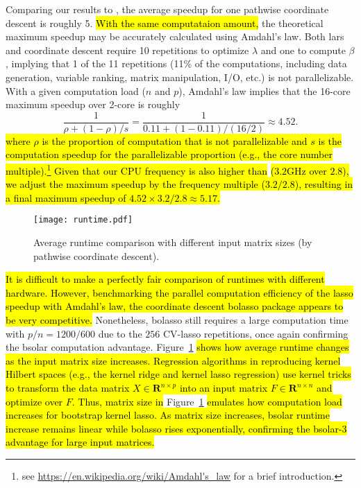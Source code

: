 \documentclass[11pt,review,authoryear]{elsarticle}
\begin{document}
Comparing our results to \citet{friedman2010regularization}, the average speedup for one pathwise coordinate descent is roughly 5. \hl{With the same computataion amount,} the theoretical maximum speedup may be accurately calculated using Amdahl's law. Both lars and coordinate descent require 10 repetitions to optimize $\lambda$ and one to compute $\beta$, implying that 1 of the 11 repetitions (11\% of the computations, including data generation, variable ranking, matrix manipulation, I/O, etc.) is not parallelizable. With a given computation load ($n$ and $p$), Amdahl's law implies that the 16-core maximum speedup over 2-core is roughly
%
\begin{equation}
  \frac{1}{\rho + (1-\rho)/s} = \frac{1}{0.11 + (1-0.11)/(16/2)} \approx 4.52.
\end{equation}
%
\hl{where $\rho$ is the proportion of computation that is not parallelizable and $s$ is the computation speedup for the parallelizable proportion (e.g., the core number multiple).\footnote{see \url{https://en.wikipedia.org/wiki/Amdahl's_law} for a brief introduction.} Given that our CPU frequency is also higher than} \citet[Table 1]{friedman2010regularization} \hl{($3.2$GHz over $2.8$), we adjust the maximum speedup by the frequency multiple ($3.2/2.8$), resulting in a final maximum speedup of $4.52 \times 3.2/2.8 \approx 5.17$.}

\begin{figure}[h]
  \centering
  \texttt{[image: runtime.pdf]}
  \caption{Average runtime comparison with different input matrix sizes (by pathwise coordinate descent).}
  \label{fig:runtime}
\end{figure}


\hl{It is difficult to make a perfectly fair comparison of runtimes with different hardware. However, benchmarking the parallel computation efficiency of the lasso speedup with Amdahl's law, the coordinate descent bolasso package appears to be very competitive.} Nonetheless, bolasso still requires a large computation time with $p/n=1200/600$ due to the $256$ CV-lasso repetitions, once again confirming the bsolar computation advantage. Figure~\ref{fig:runtime} \hl{shows how average runtime changes as the input matrix size increases. Regression algorithms in reproducing kernel Hilbert spaces (e.g., the kernel ridge and kernel lasso regression) use kernel tricks to transform the data matrix $X\in\mathbf{R}^{n\times p}$ into an input matrix $F \in \mathbf{R}^{n\times n}$ and optimize over $F$. Thus, matrix size in} Figure~\ref{fig:runtime} \hl{emulates how computation load increases for bootstrap kernel lasso. As matrix size increases, bsolar runtime increase remains linear while bolasso rises exponentially, confirming the bsolar-3 advantage for large input matrices.}
\end{document}
